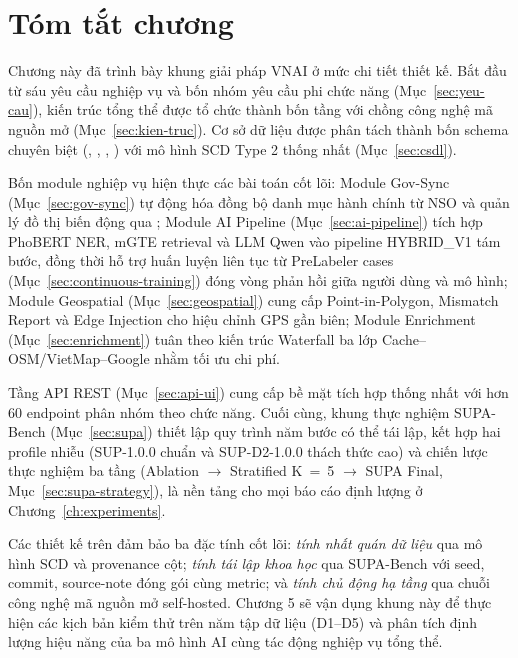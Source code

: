 \section{Tóm tắt chương}
\label{sec:tom-tat-ch4}

Chương này đã trình bày khung giải pháp VNAI ở mức chi tiết thiết kế. Bắt đầu từ sáu yêu cầu nghiệp vụ và bốn nhóm yêu cầu phi chức năng (Mục~\ref{sec:yeu-cau}), kiến trúc tổng thể được tổ chức thành bốn tầng với chồng công nghệ mã nguồn mở (Mục~\ref{sec:kien-truc}). Cơ sở dữ liệu được phân tách thành bốn schema chuyên biệt (, , , ) với mô hình SCD Type 2 thống nhất (Mục~\ref{sec:csdl}).

Bốn module nghiệp vụ hiện thực các bài toán cốt lõi: Module Gov-Sync (Mục~\ref{sec:gov-sync}) tự động hóa đồng bộ danh mục hành chính từ NSO và quản lý đồ thị biến động qua ; Module AI Pipeline (Mục~\ref{sec:ai-pipeline}) tích hợp PhoBERT NER, mGTE retrieval và LLM Qwen vào pipeline HYBRID\_V1 tám bước, đồng thời hỗ trợ huấn luyện liên tục từ PreLabeler cases (Mục~\ref{sec:continuous-training}) đóng vòng phản hồi giữa người dùng và mô hình; Module Geospatial (Mục~\ref{sec:geospatial}) cung cấp Point-in-Polygon, Mismatch Report và Edge Injection cho hiệu chỉnh GPS gần biên; Module Enrichment (Mục~\ref{sec:enrichment}) tuân theo kiến trúc Waterfall ba lớp Cache--OSM/VietMap--Google nhằm tối ưu chi phí.

Tầng API REST (Mục~\ref{sec:api-ui}) cung cấp bề mặt tích hợp thống nhất với hơn 60 endpoint phân nhóm theo chức năng. Cuối cùng, khung thực nghiệm SUPA-Bench (Mục~\ref{sec:supa}) thiết lập quy trình năm bước có thể tái lập, kết hợp hai profile nhiễu (SUP-1.0.0 chuẩn và SUP-D2-1.0.0 thách thức cao) và chiến lược thực nghiệm ba tầng (Ablation \(\to\) Stratified K~=~5 \(\to\) SUPA Final, Mục~\ref{sec:supa-strategy}), là nền tảng cho mọi báo cáo định lượng ở Chương~\ref{ch:experiments}.

Các thiết kế trên đảm bảo ba đặc tính cốt lõi: \emph{tính nhất quán dữ liệu} qua mô hình SCD và provenance cột; \emph{tính tái lập khoa học} qua SUPA-Bench với seed, commit, source-note đóng gói cùng metric; và \emph{tính chủ động hạ tầng} qua chuỗi công nghệ mã nguồn mở self-hosted. Chương 5 sẽ vận dụng khung này để thực hiện các kịch bản kiểm thử trên năm tập dữ liệu (D1--D5) và phân tích định lượng hiệu năng của ba mô hình AI cùng tác động nghiệp vụ tổng thể.
